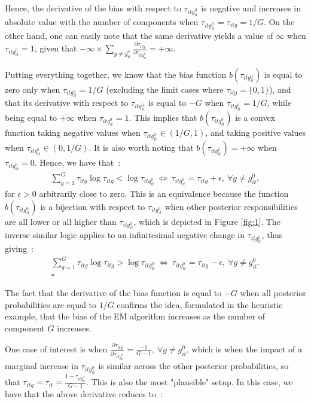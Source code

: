 \documentclass[11pt,letter]{article}
\begin{document}
Hence, the derivative of the bias with respect to $\tau_{itg^{0}_{it}}$ is negative and increases in absolute value with the number of components when $\tau_{itg^{0}_{it}} = \tau_{itg} = 1/G$. On the other hand, one can easily note that the same derivative yields a value of $\infty$ when $\tau_{itg^{0}_{it}}=1$, given that $-\infty \times \sum_{g\ne g^0_{it}} \frac{\partial \tau_{itg}}{\partial \tau_{itg^{0}_{it}}} = +\infty$.
\par
Putting everything together, we know that the bias function $b(\tau_{itg^0_{it}})$ is equal to zero only when $\tau_{itg^0_{it}} = 1/G$ (excluding the limit cases where $\tau_{itg} = \{0,1\}$), and that its derivative with respect to $\tau_{itg^0_{it}}$ is equal to $-G$ when $\tau_{itg^0_{it}} = 1/G$, while being equal to $+\infty$ when $\tau_{itg^0_{it}} = 1$. This implies that $b(\tau_{itg^0_{it}})$ is a convex function taking negative values when $\tau_{itg^0_{it}} \in (1/G,1)$, and taking positive values when $\tau_{itg^0_{it}} \in (0,1/G)$. It is also worth noting that $b(\tau_{itg^0_{it}}) = +\infty$ when $\tau_{itg^0_{it}}=0$. Hence, we have that~:
\begin{align*}
\sum_{g=1}^G \tau_{itg} \log \tau_{itg}  < \log \tau_{itg^{0}_{it}} \ \Leftrightarrow \ \tau_{itg^0_{it}} =  \tau_{itg} + \epsilon, \ \forall g \ne g^0_{it},
\end{align*}
for $\epsilon >0$ arbitrarily close to zero. This is an equivalence because the function $b(\tau_{itg^0_{it}})$ is a bijection with respect to $\tau_{itg^0_{it}}$ when other posterior responsibilities are all lower or all higher than $\tau_{itg^0_{it}}$, which is depicted in Figure \ref{fig:1}. The inverse similar logic applies to an infinitesimal negative change in $\tau_{itg^0_{it}}$, thus giving~:
\begin{align*}
\sum_{g=1}^G \tau_{itg} \log \tau_{itg}  > \log \tau_{itg^{0}_{it}} \ \Leftrightarrow \ \tau_{itg^0_{it}} =  \tau_{itg} - \epsilon, \ \forall g \ne g^0_{it}.\\
\square
\end{align*}
\par
The fact that the derivative of the bias function is equal to $-G$ when all posterior probabilities are equal to $1/G$ confirms the idea, formulated in the heuristic example, that the bias of the EM algorithm increases as the number of component $G$ increases.
\par
One case of interest is when $\frac{\partial \tau_{itg}}{\partial \tau_{itg^{0}_{it}}} = \frac{-1}{G-1}, \ \forall g \ne g^{0}_{it}$, which is when the impact of a marginal increase in $\tau_{itg^{0}_{it}}$ is similar across the other posterior probabilities, so that $\tau_{itg} = \tau_{it} = \frac{1-\tau_{itg^{0}_{it}}}{G-1}$. This is also the most "plausible" setup. In this case, we have that the above derivative reduces to~:
\end{document}
